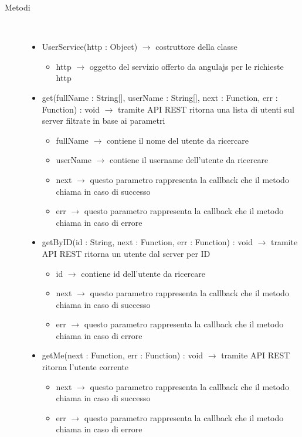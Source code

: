 \begin{description}
\item[Metodi] \hfill \\
\vspace{-7mm}
\begin{itemize}
	\item UserService(http : Object) $\rightarrow$ costruttore della classe\begin{itemize}
		\item http $\rightarrow$ oggetto del servizio offerto da angulajs per le richieste http
	\end{itemize}
	
	\item get(fullName : String[], userName : String[], next : Function, err : Function) : void $\rightarrow$ tramite API REST ritorna una lista di utenti sul server filtrate in base ai parametri\begin{itemize}
		\item fullName $\rightarrow$ contiene il nome del utente da ricercare 
		\item userName $\rightarrow$ contiene il username dell'utente da ricercare 
		\item next $\rightarrow$ questo parametro rappresenta la callback che il metodo chiama in caso di successo
		\item err $\rightarrow$ questo parametro rappresenta la callback che il metodo chiama in caso di errore
	\end{itemize}
	
	\item getByID(id : String, next : Function, err : Function) : void $\rightarrow$ tramite API REST ritorna un utente dal server per ID\begin{itemize}
		\item id $\rightarrow$ contiene id dell'utente da ricercare 
		\item next $\rightarrow$ questo parametro rappresenta la callback che il metodo chiama in caso di successo
		\item err $\rightarrow$ questo parametro rappresenta la callback che il metodo chiama in caso di errore
	\end{itemize}
	
	\item getMe(next : Function, err : Function) : void $\rightarrow$ tramite API REST ritorna l'utente corrente\begin{itemize}
		\item next $\rightarrow$ questo parametro rappresenta la callback che il metodo chiama in caso di successo
		\item err $\rightarrow$ questo parametro rappresenta la callback che il metodo chiama in caso di errore
	\end{itemize}
	

\end{itemize}
\end{description}
